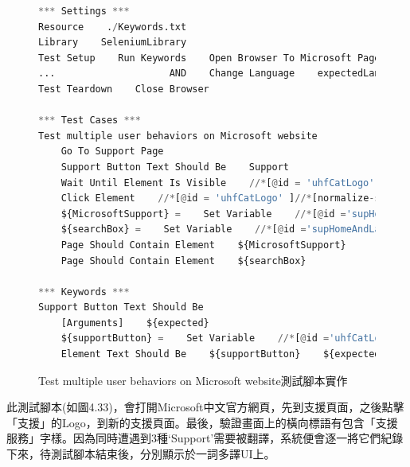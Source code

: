 \begin{figure}[H]
\begin{lstlisting}[language={python}]
*** Settings ***
Resource    ./Keywords.txt
Library    SeleniumLibrary
Test Setup    Run Keywords    Open Browser To Microsoft Page
...                    AND    Change Language    expectedLanguage=${language}
Test Teardown    Close Browser

*** Test Cases ***
Test multiple user behaviors on Microsoft website
    Go To Support Page
    Support Button Text Should Be    Support
    Wait Until Element Is Visible    //*[@id = 'uhfCatLogo' ]//*[normalize-space()='Support']
    Click Element    //*[@id = 'uhfCatLogo' ]//*[normalize-space()='Support']
    ${MicrosoftSupport} =    Set Variable    //*[@id ='supHomeAndLandingPageHeaderContainer']//*[contains(text(), 'Support')]
    ${searchBox} =    Set Variable    //*[@id ='supHomeAndLandingPageSearchBox' and @placeholder ='How can we help you?']
    Page Should Contain Element    ${MicrosoftSupport}
    Page Should Contain Element    ${searchBox}

*** Keywords ***
Support Button Text Should Be
    [Arguments]    ${expected}
    ${supportButton} =    Set Variable    //*[@id ='uhfCatLogo']
    Element Text Should Be    ${supportButton}    ${expected}
\end{lstlisting}
\caption{Test multiple user behaviors on Microsoft website測試腳本實作}
\end{figure}
此測試腳本(如圖4.33)，會打開Microsoft中文官方網頁，先到支援頁面，之後點擊「支援」的Logo，到新的支援頁面。最後，驗證畫面上的橫向標語有包含「支援服務」字樣。因為同時遭遇到3種‘Support’需要被翻譯，系統便會逐一將它們紀錄下來，待測試腳本結束後，分別顯示於一詞多譯UI上。

